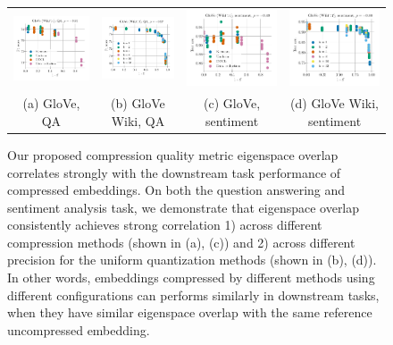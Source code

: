 \begin{figure}
	\begin{tabular}{@{\hskip -0.0in}c@{\hskip -0.0in}c@{\hskip -0.0in}c@{\hskip -0.0in}c@{\hskip -0.0in}}
		\includegraphics[width=.245\linewidth]{figures/glove400k_qa_best-f1_vs_subspace-eig-overlap_linx.pdf} &
		\includegraphics[width=.245\linewidth]{figures/glove-wiki400k-am_qa_best-f1_vs_subspace-eig-overlap_linx.pdf} &
		\includegraphics[width=.245\linewidth]{figures/glove400k_sentiment_trec_test-acc_vs_subspace-eig-overlap_linx.pdf} &
		\includegraphics[width=.245\linewidth]{figures/glove-wiki400k-am_sentiment_trec_test-acc_vs_subspace-eig-overlap_linx.pdf}	\\
		(a) GloVe, QA & (b) GloVe Wiki, QA  & (c) GloVe, sentiment & (d) GloVe Wiki, sentiment
	\end{tabular}
	\caption{Our proposed compression quality metric eigenspace overlap correlates strongly with the downstream task performance of compressed embeddings.  On both the question answering and sentiment analysis task, we demonstrate that eigenspace overlap consistently achieves strong correlation 1) across different compression methods (shown in (a), (c)) and 2) across different precision for the uniform quantization methods (shown in (b), (d)). In other words, embeddings compressed by different methods using different configurations can performs similarly in downstream tasks, when they have similar eigenspace overlap with the same reference uncompressed embedding.}
	\label{fig:good_correlation}
\end{figure}

